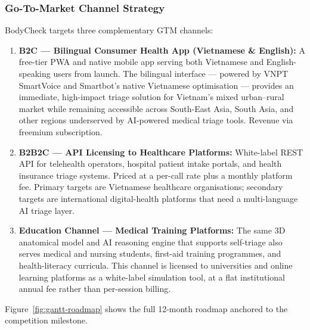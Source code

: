 \subsubsection*{Go-To-Market Channel Strategy}

BodyCheck targets three complementary GTM channels:

\begin{enumerate}[leftmargin=2em, itemsep=4pt, topsep=4pt]
  \item \textbf{B2C --- Bilingual Consumer Health App (Vietnamese \& English):}
        A free-tier PWA and native mobile app serving both Vietnamese and
        English-speaking users from launch. The bilingual interface --- powered
        by VNPT SmartVoice and Smartbot's native Vietnamese optimisation ---
        provides an immediate, high-impact triage solution for Vietnam's mixed
        urban--rural market while remaining accessible across South-East Asia,
        South Asia, and other regions underserved by AI-powered medical triage
        tools. Revenue via freemium subscription.
  \item \textbf{B2B2C --- API Licensing to Healthcare Platforms:}
        White-label REST API for telehealth operators, hospital patient
        intake portals, and health insurance triage systems. Priced at
        a per-call rate plus a monthly platform fee. Primary targets
        are Vietnamese healthcare organisations; secondary targets are
        international digital-health platforms that need a
        multi-language AI triage layer.
  \item \textbf{Education Channel --- Medical Training Platforms:}
        The same 3D anatomical model and AI reasoning engine that
        supports self-triage also serves medical and nursing students,
        first-aid training programmes, and health-literacy curricula.
        This channel is licensed to universities and online learning
        platforms as a white-label simulation tool, at a flat
        institutional annual fee rather than per-session billing.
\end{enumerate}

Figure~\ref{fig:gantt-roadmap} shows the full 12-month roadmap anchored
to the competition milestone.

